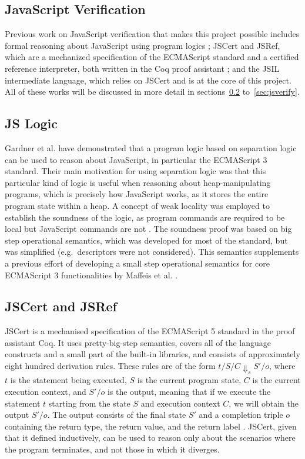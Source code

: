 \documentclass[a4paper,11pt,twoside]{report}
\newif\ifComments
\newcommand{\pmax}[1]{%
\ifComments
\begin{center}
\fbox{%
\begin{minipage}{3in} \color{blue}
{\bf PM:} {\rm #1}
\end{minipage}
}
\end{center}
\fi
}
\begin{document}
\subsection{JavaScript Verification}

\pmax{JavaScript, Internet, widespread, data security, leaks, this and that}

Previous work on JavaScript verification that makes this project possible includes formal reasoning about JavaScript using program logics \cite{Gardner:2012}; JSCert and JSRef, which are a mechanized specification of the ECMAScript standard and a certified reference interpreter, both written in the Coq proof assistant \cite{Bodin:2014}; and the JSIL intermediate language, which relies on JSCert and is at the core of this project. All of these works will be discussed in more detail in sections~\ref{sec:jslogic} to~\ref{sec:jsverify}.

\subsection{JS Logic}\label{sec:jslogic}
Gardner et al. \cite{Gardner:2012} have demonstrated that a program logic based on separation logic can be used to reason about JavaScript, in particular the ECMAScript 3 standard. Their main motivation for using separation logic was that this particular kind of logic is useful when reasoning about heap-manipulating programs, which is precisely how JavaScript works, as it stores the entire program state within a heap. A concept of weak locality was employed to establish the soundness of the logic, as program commands are required to be local but JavaScript commands are not \cite{Gardner:2012}. The soundness proof was based on big step operational semantics, which was developed for most of the standard, but was simplified (e.g.~descriptors were not considered). This semantics supplements a previous effort of developing a small step operational semantics for core ECMAScript 3 functionalities by Maffeis et al. \cite{Maffeis:2008}.

\subsection{JSCert and JSRef}\label{sec:jscert}
JSCert is a mechanised specification of the ECMAScript 5 standard in the proof assistant Coq\cite{Bodin:2014}. It uses pretty-big-step semantics, covers all of the language constructs and a small part of the built-in libraries, and consists of approximately eight hundred derivation rules. These rules are of the form $t/S/C \Downarrow_s S'/o$, where $t$ is the statement being executed, $S$ is the current program state, $C$ is the current execution context, and $S'/o$ is the output, meaning that if we execute the statement $t$ starting from the state $S$ and execution context $C$, we will obtain the output $S'/o$. The output consists of the final state $S'$ and a completion triple $o$ containing the return type, the return value, and the return label \cite{Bodin:2014}. JSCert, given that it defined inductively, can be used to reason only about the scenarios where the program terminates, and not those in which it diverges. 
\end{document}
